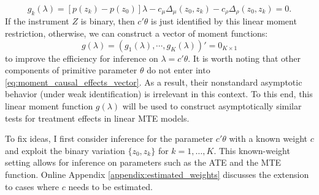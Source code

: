 \documentclass[11pt]{article}
\theoremstyle{definition}
\newcommand{\0}{\ensuremath{\mathbf{0}}}
\begin{document}
\begin{bibunit}
\begin{equation}
\label{eq:moment_causal_effects}
	g_k(\lambda) = \left[p(z_k) - p(z_0)\right]\lambda - c_\mu\Delta_\mu(z_0,z_k) - c_\rho \Delta_\rho(z_0,z_k) = 0.
\end{equation}
If the instrument $Z$ is binary, then $c'\theta$ is just identified by this linear moment restriction, otherwise, we can construct a vector of moment functions:
\begin{equation}
\label{eq:moment_causal_effects_vector}
	g(\lambda) = (g_1(\lambda), \cdots, g_K(\lambda))' = 0_{K\times 1}
\end{equation}
to improve the efficiency for inference on $\lambda = c'\theta$. It is worth noting that other components of primitive parameter $\theta$ do not enter into \eqref{eq:moment_causal_effects_vector}. As a result, their nonstandard asymptotic behavior (under weak identification) is irrelevant in this context. To this end, this linear moment function $g(\lambda)$ will be used to construct asymptotically similar tests for treatment effects in linear MTE models. 

To fix ideas, I first consider inference for the parameter $c'\theta$ with a known weight $c$ and exploit the binary variation $\{z_0, z_k\}$ for $k = 1,\ldots,K$. This known-weight setting allows for inference on parameters such as the ATE and the MTE function. Online Appendix \ref{appendix:estimated_weights} discusses the extension to cases where $c$ needs to be estimated.



\end{bibunit}
\end{document}
